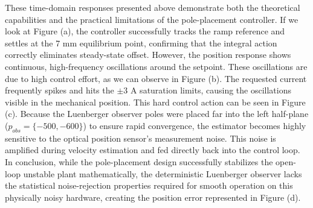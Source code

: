 These time-domain responses presented above demonstrate both the theoretical capabilities and the practical limitations of the pole-placement controller. If we look at Figure (a), the controller successfully tracks the ramp reference and settles at the 7 mm equilibrium point, confirming that the integral action correctly eliminates steady-state offset. However, the position response shows continuous, high-frequency oscillations around the setpoint.
These oscillations are due to high control effort, as we can observe in Figure (b). The requested current frequently spikes and hits the $\pm 3$ A saturation limits, causing the oscillations visible in the mechanical position.
This hard control action can be seen in Figure (c). Because the Luenberger observer poles were placed far into the left half-plane ($p_{obs}=\{-500,-600\}$) to ensure rapid convergence, the estimator becomes highly sensitive to the optical position sensor's measurement noise. This noise is amplified during velocity estimation and fed directly back into the control loop. In conclusion, while the pole-placement design successfully stabilizes the open-loop unstable plant mathematically, the deterministic Luenberger observer lacks the statistical noise-rejection properties required for smooth operation on this physically noisy hardware, creating the position error represented in Figure (d). 

